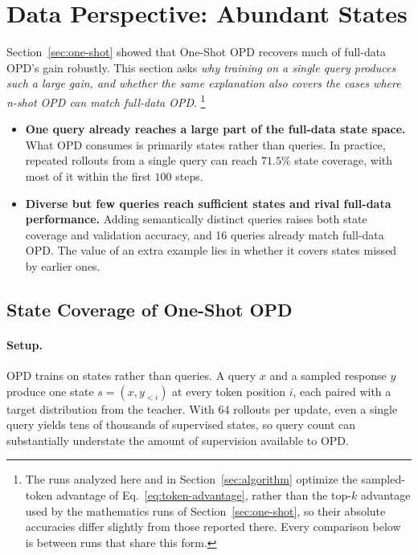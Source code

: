 \section{Data Perspective: Abundant States}
\label{sec:data}

Section~\ref{sec:one-shot} showed that One-Shot OPD recovers much of full-data OPD's gain robustly. This section asks \textit{why training on a single query produces such a large gain, and whether the same explanation also covers the cases where n-shot OPD can match full-data OPD}. \footnote{The runs analyzed here and in Section~\ref{sec:algorithm} optimize the sampled-token advantage of Eq.~\ref{eq:token-advantage}, rather than the top-\(k\) advantage used by the mathematics runs of Section~\ref{sec:one-shot}, so their absolute accuracies differ slightly from those reported there. Every comparison below is between runs that share this form.}

\begin{tcolorbox}[takeawaysbox]
\begin{itemize}[topsep=0pt, partopsep=0pt, leftmargin=12pt, itemsep=0pt]
    \item \textbf{One query already reaches a large part of the full-data state space.}
    What OPD consumes is primarily states rather than queries. In practice, repeated rollouts from a single query can reach \(71.5\%\) state coverage, with most of it within the first \(100\) steps.

    \item \textbf{Diverse but few queries reach sufficient states and rival full-data performance.} Adding semantically distinct queries raises both state coverage and validation accuracy, and 16 queries already match full-data OPD. The value of an extra example lies in whether it covers states missed by earlier ones.
\end{itemize}
\end{tcolorbox}

\subsection{State Coverage of One-Shot OPD}
\label{sec:state-coverage}

\paragraph{Setup.}
OPD trains on states rather than queries. A query \(x\) and a sampled response \(y\) produce one state \(s=(x,y_{<i})\) at every token position \(i\), each paired with a target distribution from the teacher. With \(64\) rollouts per update, even a single query yields tens of thousands of supervised states, so query count can substantially understate the amount of supervision available to OPD.

